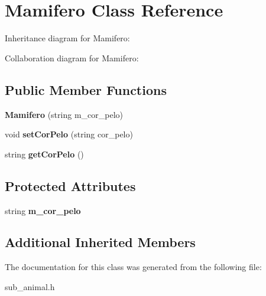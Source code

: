 \hypertarget{classMamifero}{}\section{Mamifero Class Reference}
\label{classMamifero}


Inheritance diagram for Mamifero\+:


Collaboration diagram for Mamifero\+:
\subsection*{Public Member Functions}
\begin{DoxyCompactItemize}
\item 
\mbox{\label{classMamifero_ae0523f18b8c6cb1aab9c5d36b99e89b3}} 
{\bfseries Mamifero} (string m\+\_\+cor\+\_\+pelo)
\item 
\mbox{\label{classMamifero_ab8c8c56b70cc74feba49e2f6a1909881}} 
void {\bfseries set\+Cor\+Pelo} (string cor\+\_\+pelo)
\item 
\mbox{\label{classMamifero_a2b17edd19198da611fae8b92c9110ec9}} 
string {\bfseries get\+Cor\+Pelo} ()
\end{DoxyCompactItemize}
\subsection*{Protected Attributes}
\begin{DoxyCompactItemize}
\item 
\mbox{\label{classMamifero_a4463eb72abe3756b6bbd00fb43bbc883}} 
string {\bfseries m\+\_\+cor\+\_\+pelo}
\end{DoxyCompactItemize}
\subsection*{Additional Inherited Members}


The documentation for this class was generated from the following file\+:\begin{DoxyCompactItemize}
\item 
sub\+\_\+animal.\+h\end{DoxyCompactItemize}
